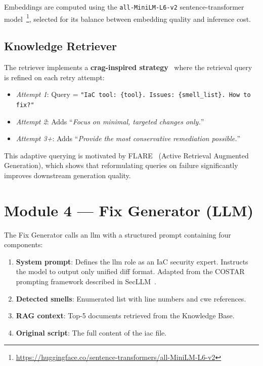 \documentclass[12pt, a4paper]{report}
\begin{document}
\begin{sloppypar}
Embeddings are computed using the \texttt{all-MiniLM-L6-v2} sentence-transformer
model~\footnote{\url{https://huggingface.co/sentence-transformers/all-MiniLM-L6-v2}},
selected for its balance between embedding quality and inference cost.
\end{sloppypar}

\subsection{Knowledge Retriever}

The retriever implements a \textbf{\gls{crag}-inspired strategy}~\citep{yao2024crag}
where the retrieval query is refined on each retry attempt:

\begin{itemize}
  \item \emph{Attempt 1}: Query = \texttt{"IaC tool: \{tool\}. Issues: \{smell\_list\}. How to fix?"}
  \item \emph{Attempt 2}: Adds ``\emph{Focus on minimal, targeted changes only.}''
  \item \emph{Attempt 3+}: Adds ``\emph{Provide the most conservative remediation possible.}''
\end{itemize}

This adaptive querying is motivated by FLARE~\citep{jiang2023flare} (Active Retrieval
Augmented Generation), which shows that reformulating queries on failure significantly
improves downstream generation quality.

\section{Module 4 --- Fix Generator (LLM)}

The Fix Generator calls an \gls{llm} with a structured prompt containing four components:

\begin{enumerate}
  \item \textbf{System prompt}: Defines the \gls{llm} role as an IaC security expert.
  Instructs the model to output only unified diff format. Adapted from the
  COSTAR prompting framework described in SecLLM~\citep{devito2025secllm}.
  \item \textbf{Detected smells}: Enumerated list with line numbers and \gls{cwe} references.
  \item \textbf{RAG context}: Top-5 documents retrieved from the Knowledge Base.
  \item \textbf{Original script}: The full content of the \gls{iac} file.
\end{enumerate}
\end{document}
